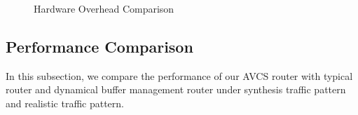 \documentclass[10pt,conference]{IEEEtran}
\begin{document}
\begin{figure}
  \centering
  \hspace{10pt}
  \caption{Hardware Overhead Comparison}\label{bufcmp}
\end{figure}

\subsection{Performance Comparison}
In this subsection, we compare the performance of our AVCS router with typical router \cite{DaTo01} and dynamical buffer management router \cite{NPKV06}\cite{4555894} under synthesis traffic pattern and realistic traffic pattern.
\end{document}
